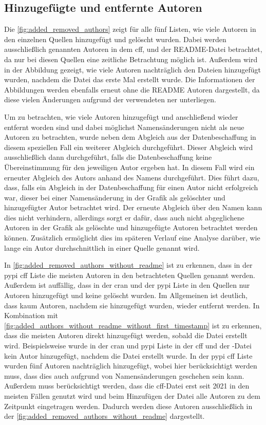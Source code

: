 \subsection*{Hinzugefügte und entfernte Autoren}
Die \autoref{fig:added_removed_authors} zeigt für alle fünf Listen, wie viele Autoren in den einzelnen Quellen hinzugefügt und gelöscht wurden.
Dabei werden ausschließlich genannten Autoren in dem \gls{cff},  und der README-Datei betrachtet, da nur bei diesen Quellen eine zeitliche Betrachtung möglich ist.
Außerdem wird in der Abbildung gezeigt, wie viele Autoren nachträglich den Dateien hinzugefügt wurden, nachdem die Datei das erste Mal erstellt wurde.
Die Informationen der Abbildungen werden ebenfalls erneut ohne die README Autoren dargestellt, da diese vielen Änderungen aufgrund der verwendeten \gls{ner} unterliegen.

Um zu betrachten, wie viele Autoren hinzugefügt und anschließend wieder entfernt worden sind und dabei möglichst Namensänderungen nicht als neue Autoren zu betrachten, wurde neben dem Abgleich aus der Datenbeschaffung in diesem speziellen Fall ein weiterer Abgleich durchgeführt.
Dieser Abgleich wird ausschließlich dann durchgeführt, falls die Datenbeschaffung keine Übereinstimmung für den jeweiligen Autor ergeben hat.
In diesem Fall wird ein erneuter Abgleich des Autors anhand des Namens durchgeführt.
Dies führt dazu, dass, falls ein Abgleich in der Datenbeschaffung für einen Autor nicht erfolgreich war, dieser bei einer Namensänderung in der Grafik als gelöschter und hinzugefügter Autor betrachtet wird.
Der erneute Abgleich über den Namen kann dies nicht verhindern, allerdings sorgt er dafür, dass auch nicht abgeglichene Autoren in der Grafik als gelöschte und hinzugefügte Autoren betrachtet werden können.
Zusätzlich ermöglicht dies im späteren Verlauf eine Analyse darüber, wie lange ein Autor durchschnittlich in einer Quelle genannt wird.

In \autoref{fig:added_removed_authors_without_readme} ist zu erkennen, dass in der \gls{pypi} \gls{cff} Liste die meisten Autoren in den betrachteten Quellen genannt werden.
Außerdem ist auffällig, dass in der \gls{cran} und der \gls{pypi} Liste in den Quellen nur Autoren hinzugefügt und keine gelöscht wurden.
Im Allgemeinen ist deutlich, dass kaum Autoren, nachdem sie hinzugefügt wurden, wieder entfernt werden.
In Kombination mit \autoref{fig:added_authors_without_readme_without_first_timestamp} ist zu erkennen, dass die meisten Autoren direkt hinzugefügt werden, sobald die Datei erstellt wird.
Beispielsweise wurde in der \gls{cran} und \gls{pypi} Liste in der \gls{cff} und der -Datei kein Autor hinzugefügt, nachdem die Datei erstellt wurde.
In der \gls{pypi} \gls{cff} Liste wurden fünf Autoren nachträglich hinzugefügt, wobei hier berücksichtigt werden muss, dass dies auch aufgrund von Namensänderungen geschehen sein kann.
Außerdem muss berücksichtigt werden, dass die \gls{cff}-Datei erst seit 2021 in den meisten Fällen genutzt wird und beim Hinzufügen der Datei alle Autoren zu dem Zeitpunkt eingetragen werden.
Dadurch werden diese Autoren ausschließlich in der \autoref{fig:added_removed_authors_without_readme} dargestellt.


